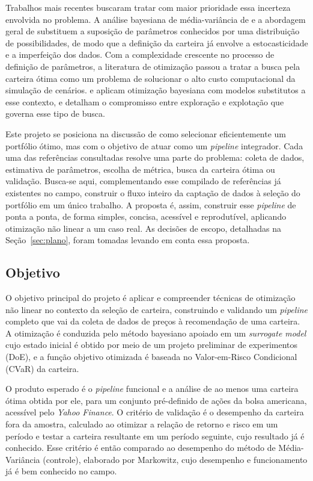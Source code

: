 \documentclass[12pt,a4paper]{article}
\begin{document}
Trabalhos mais recentes buscaram tratar com maior prioridade essa incerteza envolvida no problema. A análise bayesiana de média-variância de  e a abordagem geral de  substituem a suposição de parâmetros conhecidos por uma distribuição de possibilidades, de modo que a definição da carteira já envolve a estocasticidade e a imperfeição dos dados. Com a complexidade crescente no processo de definição de parâmetros, a literatura de otimização passou a tratar a busca pela carteira ótima como um problema de solucionar o alto custo computacional da simulação de cenários.  e  aplicam otimização bayesiana com modelos substitutos a esse contexto, e  detalham o compromisso entre exploração e explotação que governa esse tipo de busca.

Este projeto se posiciona na discussão de como selecionar eficientemente um portfólio ótimo, mas com o objetivo de atuar como um \textit{pipeline} integrador. Cada uma das referências consultadas resolve uma parte do problema: coleta de dados, estimativa de parâmetros, escolha de métrica, busca da carteira ótima ou validação. Busca-se aqui, complementando esse compilado de referências já existentes no campo, construir o fluxo inteiro da captação de dados à seleção do portfólio em um único trabalho. A proposta é, assim, construir esse \textit{pipeline} de ponta a ponta, de forma simples, concisa, acessível e reprodutível, aplicando otimização não linear a um caso real. As decisões de escopo, detalhadas na Seção~\ref{sec:plano}, foram tomadas levando em conta essa proposta.

\subsection{Objetivo}

O objetivo principal do projeto é aplicar e compreender técnicas de otimização não linear no contexto da seleção de carteira, construindo e validando um \textit{pipeline} completo que vai da coleta de dados de preços à recomendação de uma carteira. A otimização é conduzida pelo método bayesiano apoiado em um \textit{surrogate model} cujo estado inicial é obtido por meio de um projeto preliminar de experimentos (DoE), e a função objetivo otimizada é baseada no Valor-em-Risco Condicional (CVaR) da carteira.

O produto esperado é o \textit{pipeline} funcional e a análise de ao menos uma carteira ótima obtida por ele, para um conjunto pré-definido de ações da bolsa americana, acessível pelo \textit{Yahoo Finance}. O critério de validação é o desempenho da carteira fora da amostra, calculado ao otimizar a relação de retorno e risco em um período e testar a carteira resultante em um período seguinte, cujo resultado já é conhecido. Esse critério é então comparado ao desempenho do método de Média-Variância (controle), elaborado por Markowitz, cujo desempenho e funcionamento já é bem conhecido no campo.
\end{document}
